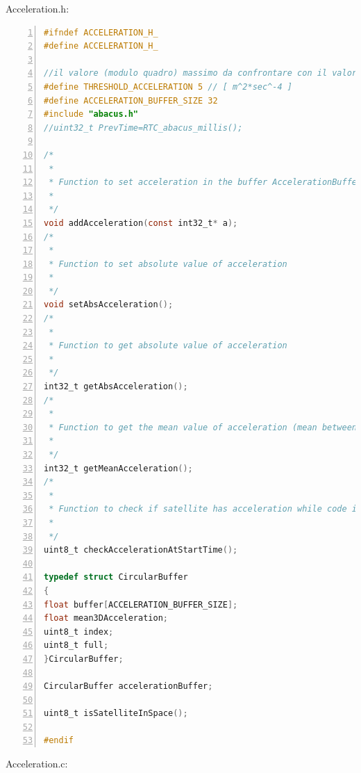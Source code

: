 \documentclass[LaM,binding=0.6cm,oneside]{../sapthesis}
\begin{document}
Acceleration.h:
\begin{lstlisting}[language=C,
                   basicstyle=\scriptsize,
                   numbers=left,
                   stepnumber=0,
                   numbersep=4pt,
                   tabsize=2,
                   showspaces=false,
                   showstringspaces=false]
#ifndef ACCELERATION_H_
#define ACCELERATION_H_

//il valore (modulo quadro) massimo da confrontare con il valore corrente di accelerazione (servirÃ  un valore molto piÃ¹ basso)
#define THRESHOLD_ACCELERATION 5 // [ m^2*sec^-4 ]
#define ACCELERATION_BUFFER_SIZE 32
#include "abacus.h"
//uint32_t PrevTime=RTC_abacus_millis();

/*
 *
 * Function to set acceleration in the buffer AccelerationBuffer
 *
 */
void addAcceleration(const int32_t* a);
/*
 *
 * Function to set absolute value of acceleration 
 *
 */
void setAbsAcceleration();
/*
 *
 * Function to get absolute value of acceleration
 *
 */
int32_t getAbsAcceleration();
/*
 *
 * Function to get the mean value of acceleration (mean between ACCELEARTION_BUFFER_SIZE amount of samples)
 *
 */
int32_t getMeanAcceleration();
/*
 *
 * Function to check if satellite has acceleration while code is running. This should check only one time acceleration and stop all the operations if needed for N seconds
 *
 */
uint8_t checkAccelerationAtStartTime();

typedef struct CircularBuffer
{
float buffer[ACCELERATION_BUFFER_SIZE];
float mean3DAcceleration;
uint8_t index;
uint8_t full;
}CircularBuffer;

CircularBuffer accelerationBuffer;

uint8_t isSatelliteInSpace();

#endif
\end{lstlisting}
Acceleration.c:
\end{document}
